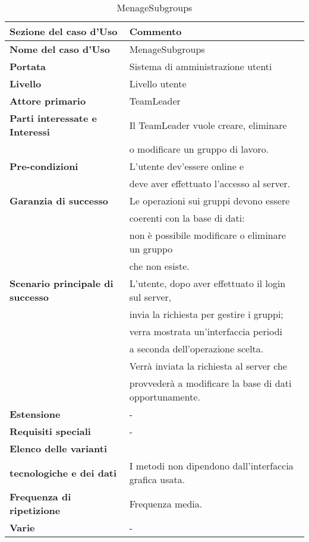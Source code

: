 \documentclass[12pt]{scrartcl}
\begin{document}
\begin{table}[h!]
  \caption{MenageSubgroups}
  \label{tab:table3}
  \begin{tabular}{|l|l|}
    \toprule
    \textbf{Sezione del caso d'Uso} & \textbf{Commento}\\
    \midrule
    \textbf{Nome del caso d'Uso} & MenageSubgroups\\
    \midrule
    \textbf{Portata} & Sistema di amministrazione utenti\\
    \midrule
    \textbf{Livello} & Livello utente\\
    \midrule
    \textbf{Attore primario} & TeamLeader\\
    \midrule
    \textbf{Parti interessate e Interessi} & Il TeamLeader vuole creare, eliminare \\& o modificare un gruppo di lavoro.\\
    \midrule
    \textbf{Pre-condizioni} & L'utente dev'essere online e \\& deve aver effettuato l'accesso al server.\\
    \midrule
    \textbf{Garanzia di successo} & Le operazioni sui gruppi devono essere 
    \\& coerenti con la base di dati:\\& 
    non \`e possibile modificare o eliminare un gruppo 
    \\& che non esiste.\\
    \midrule
    \textbf{Scenario principale di successo} & L'utente, dopo aver effettuato il login sul server,
    \\& invia la richiesta per gestire i gruppi; 
    \\& verra mostrata un'interfaccia periodi
    \\& a seconda dell'operazione scelta. 
    \\& Verr\`a inviata la richiesta al server che
    \\& provveder\`a a modificare la base di dati opportunamente.\\
    \midrule
    \textbf{Estensione} & - \\
    \midrule
    \textbf{Requisiti speciali} & - \\
    \midrule
    \textbf{Elenco delle varianti}\\ \textbf{tecnologiche e dei dati} & I metodi non dipendono dall'interfaccia grafica usata.\\
    \midrule
    \textbf{Frequenza di ripetizione} & Frequenza media.\\
    \midrule
    \textbf{Varie} & - \\
    \bottomrule
  \end{tabular}
\end{table}
\end{document}
